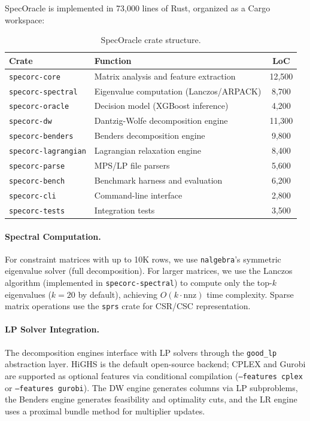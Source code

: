 \documentclass[11pt]{article}
\begin{document}
SpecOracle is implemented in 73,000 lines of Rust, organized as a Cargo workspace:

\begin{table}[t]
\centering
\caption{SpecOracle crate structure.}
\begin{tabular}{llc}
\toprule
\textbf{Crate} & \textbf{Function} & \textbf{LoC} \\
\midrule
\texttt{specorc-core} & Matrix analysis and feature extraction & 12,500 \\
\texttt{specorc-spectral} & Eigenvalue computation (Lanczos/ARPACK) & 8,700 \\
\texttt{specorc-oracle} & Decision model (XGBoost inference) & 4,200 \\
\texttt{specorc-dw} & Dantzig-Wolfe decomposition engine & 11,300 \\
\texttt{specorc-benders} & Benders decomposition engine & 9,800 \\
\texttt{specorc-lagrangian} & Lagrangian relaxation engine & 8,400 \\
\texttt{specorc-parse} & MPS/LP file parsers & 5,600 \\
\texttt{specorc-bench} & Benchmark harness and evaluation & 6,200 \\
\texttt{specorc-cli} & Command-line interface & 2,800 \\
\texttt{specorc-tests} & Integration tests & 3,500 \\
\bottomrule
\end{tabular}
\end{table}

\paragraph{Spectral Computation.}
For constraint matrices with up to 10K rows, we use \texttt{nalgebra}'s symmetric eigenvalue solver (full decomposition). For larger matrices, we use the Lanczos algorithm (implemented in \texttt{specorc-spectral}) to compute only the top-$k$ eigenvalues ($k = 20$ by default), achieving $O(k \cdot \text{nnz})$ time complexity. Sparse matrix operations use the \texttt{sprs} crate for CSR/CSC representation.

\paragraph{LP Solver Integration.}
The decomposition engines interface with LP solvers through the \texttt{good\_lp} abstraction layer. HiGHS is the default open-source backend; CPLEX and Gurobi are supported as optional features via conditional compilation (\texttt{--features cplex} or \texttt{--features gurobi}). The DW engine generates columns via LP subproblems, the Benders engine generates feasibility and optimality cuts, and the LR engine uses a proximal bundle method for multiplier updates.
\end{document}
